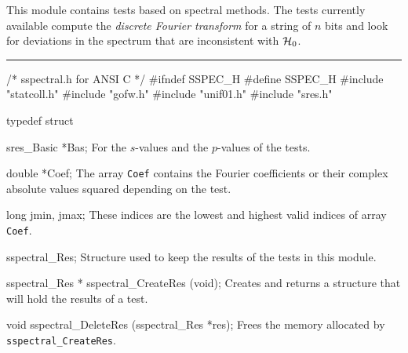 
This module contains tests based on spectral methods.
%
%
The tests currently available compute the {\em discrete Fourier transform\/}
for a string of $n$ bits and look for deviations in the spectrum
%
that are inconsistent with $\mathcal{H}_0$.  
\resdef

\bigskip
\hrule
\code\hide
/* sspectral.h  for ANSI C */
#ifndef SSPEC_H
#define SSPEC_H
\endhide
#include "statcoll.h"
#include "gofw.h"
#include "unif01.h"
#include "sres.h"
\endcode

\ifdetailed %

\code
typedef struct {

   sres_Basic *Bas;
\endcode
 \tabb
  For the $s$-values and the $p$-values of the tests.
 \endtabb
\code

   double *Coef;
\endcode
 \tabb  The array {\tt Coef} contains the
  Fourier coefficients or their complex absolute values squared
  depending on the test.
 \endtabb
\code

   long jmin, jmax;
\endcode
 \tabb
  These indices are the lowest and highest valid indices
  of array {\tt Coef}.
 \endtabb
\code

} sspectral_Res;
\endcode
 \tab
  Structure used to keep the results of the tests in this module.
 \endtab
\code


sspectral_Res * sspectral_CreateRes (void);
\endcode
 \tab 
  Creates and returns a structure that will hold the results
  of a test. 
 \endtab
\code


void sspectral_DeleteRes (sspectral_Res *res);
\endcode
 \tab 
  Frees the memory allocated by {\tt sspectral\_CreateRes}.
 \endtab

\fi    %



\code

